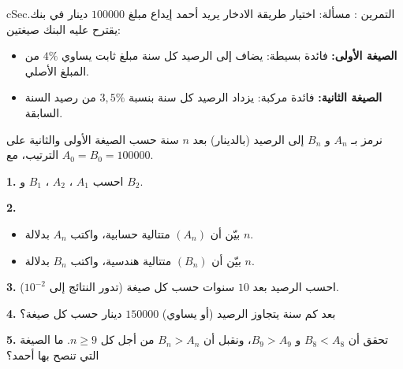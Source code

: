 \documentclass[12pt,a4paper]{article}
\newenvironment{BOX}[2]{\begin{otherlanguage}{english}\begin{arbox}{#1}{#2}}{\end{arbox}\end{otherlanguage}}
\newcounter{exo}
\newenvironment{tamrin}[1]{\stepcounter{exo}\begin{BOX}{cSec}{التمرين \theexo: #1}}{\end{BOX}}
\newenvironment{sq}{\begin{itemize}[leftmargin=2.4em,itemsep=3pt]}{\end{itemize}}
\newcommand{\qa}{\item[(أ)]}\newcommand{\qb}{\item[(ب)]}\newcommand{\qc}{\item[(جـ)]}\newcommand{\qd}{\item[(د)]}\newcommand{\qe}{\item[(هـ)]}
\newcommand{\QQ}[1]{\par\smallskip\textbf{#1.} }
\begin{document}
\begin{tamrin}{مسألة: اختيار طريقة الادخار}
يريد أحمد إيداع مبلغ $100000$ دينار في بنك. يقترح عليه البنك صيغتين:
\begin{itemize}
\item \textbf{الصيغة الأولى:} فائدة بسيطة: يضاف إلى الرصيد كل سنة مبلغ ثابت يساوي $4\%$ من المبلغ الأصلي.
\item \textbf{الصيغة الثانية:} فائدة مركبة: يزداد الرصيد كل سنة بنسبة $3{,}5\%$ من رصيد السنة السابقة.
\end{itemize}
نرمز بـ $A_n$ و $B_n$ إلى الرصيد (بالدينار) بعد $n$ سنة حسب الصيغة الأولى والثانية على الترتيب، مع $A_0=B_0=100000$.
\QQ{1} احسب $A_1$ ، $A_2$ ، $B_1$ و $B_2$.
\QQ{2}
\begin{sq}
\qa بيّن أن $(A_n)$ متتالية حسابية، واكتب $A_n$ بدلالة $n$.
\qb بيّن أن $(B_n)$ متتالية هندسية، واكتب $B_n$ بدلالة $n$.
\end{sq}
\QQ{3} احسب الرصيد بعد $10$ سنوات حسب كل صيغة (تدور النتائج إلى $10^{-2}$).
\QQ{4} بعد كم سنة يتجاوز الرصيد (أو يساوي) $150000$ دينار حسب كل صيغة؟
\QQ{5} تحقق أن $B_8<A_8$ و $B_9>A_9$، ونقبل أن $B_n>A_n$ من أجل كل $n\geqslant 9$. ما الصيغة التي تنصح بها أحمد؟
\end{tamrin}
\end{document}
